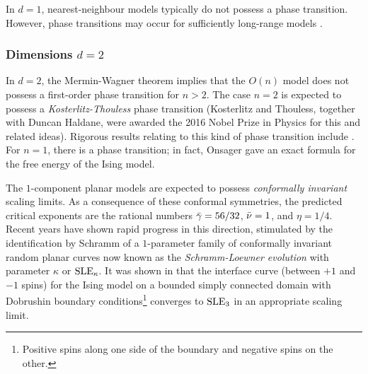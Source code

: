 In $d = 1$, nearest-neighbour models typically do not possess a phase transition.
However, phase transitions may occur for sufficiently long-range models \cite{Dyso69}.

\subsubsection{Dimensions $d = 2$}

In $d = 2$, the Mermin-Wagner theorem \cite{MW66} implies that the $O(n)$ model does
not possess a first-order phase transition for $n > 2$. The case $n = 2$ is expected
to possess a \emph{Kosterlitz-Thouless} phase transition \cite{KT73}
(Kosterlitz and Thouless, together with Duncan Haldane, were awarded
the 2016 Nobel Prize in Physics for this and related ideas). Rigorous results relating
to this kind of phase transition include \cite{FS81,Falc12,Falc13}.
For $n = 1$, there is a phase transition; in fact, Onsager \cite{Onsager44} gave an
exact formula for the free energy of the Ising model.

The $1$-component planar models are expected to possess \emph{conformally invariant}
scaling limits. As a consequence of these conformal symmetries,
the predicted critical exponents are the rational numbers $\bar\gamma = 56/32$, $\bar\nu = 1$,
and $\eta = 1/4$. Recent years have shown rapid progress in this direction, stimulated
by the identification by Schramm \cite{Schramm00} of a $1$-parameter family of
conformally invariant random planar curves now known as the \emph{Schramm-Loewner
evolution} with parameter $\kappa$ or ${\rm SLE}_\kappa$. It was shown in \cite{CDHKS14}
that the interface curve (between $+ 1$ and $-1$ spins) for the Ising model on a
bounded simply connected domain with Dobrushin boundary
conditions\footnote{Positive spins along one side of the
boundary and negative spins on the other.} converges to ${\rm SLE}_3$ in
an appropriate scaling limit.

